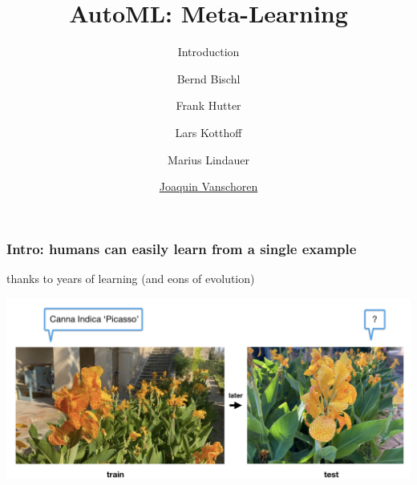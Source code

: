
\usepackage{multimedia}

\title[Meta-Learning]{AutoML: Meta-Learning} 
\subtitle{Introduction}
\author[Joaquin Vanschoren]{Bernd Bischl \and Frank Hutter \and Lars Kotthoff\newline \and Marius Lindauer \and \underline{Joaquin Vanschoren}}
\institute{}
\date{}


\maketitle




\begin{frame}
\frametitle{Intro: humans can easily learn from a single example}
thanks to years of learning (and eons of evolution) 

\includegraphics[height=6cm]{image/img162621.jpg}

\end{frame}

